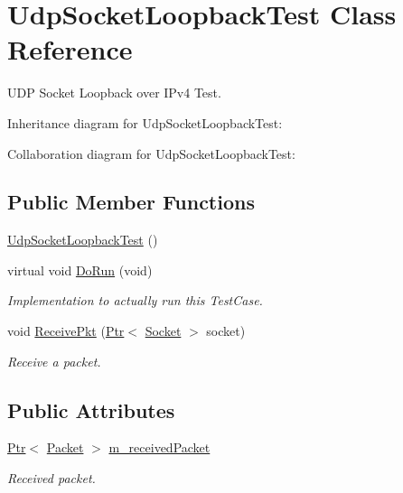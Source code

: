 \hypertarget{classUdpSocketLoopbackTest}{}\section{Udp\+Socket\+Loopback\+Test Class Reference}
\label{classUdpSocketLoopbackTest}


U\+DP Socket Loopback over I\+Pv4 Test.  




Inheritance diagram for Udp\+Socket\+Loopback\+Test\+:


Collaboration diagram for Udp\+Socket\+Loopback\+Test\+:
\subsection*{Public Member Functions}
\begin{DoxyCompactItemize}
\item 
\hyperlink{classUdpSocketLoopbackTest_af0956eb7b4dd74064bef14aa8bd6e4e9}{Udp\+Socket\+Loopback\+Test} ()
\item 
virtual void \hyperlink{classUdpSocketLoopbackTest_ad67d24a84aa78cff5f3bac8acbab79d4}{Do\+Run} (void)
\begin{DoxyCompactList}\small\item\em Implementation to actually run this Test\+Case. \end{DoxyCompactList}\item 
void \hyperlink{classUdpSocketLoopbackTest_a97de9b7e8d7e9a245db7fe4582e0c99d}{Receive\+Pkt} (\hyperlink{classns3_1_1Ptr}{Ptr}$<$ \hyperlink{classns3_1_1Socket}{Socket} $>$ socket)
\begin{DoxyCompactList}\small\item\em Receive a packet. \end{DoxyCompactList}\end{DoxyCompactItemize}
\subsection*{Public Attributes}
\begin{DoxyCompactItemize}
\item 
\hyperlink{classns3_1_1Ptr}{Ptr}$<$ \hyperlink{classns3_1_1Packet}{Packet} $>$ \hyperlink{classUdpSocketLoopbackTest_a14e3e2394b5c010739ba0cfe766cb951}{m\+\_\+received\+Packet}
\begin{DoxyCompactList}\small\item\em Received packet. \end{DoxyCompactList}\end{DoxyCompactItemize}
